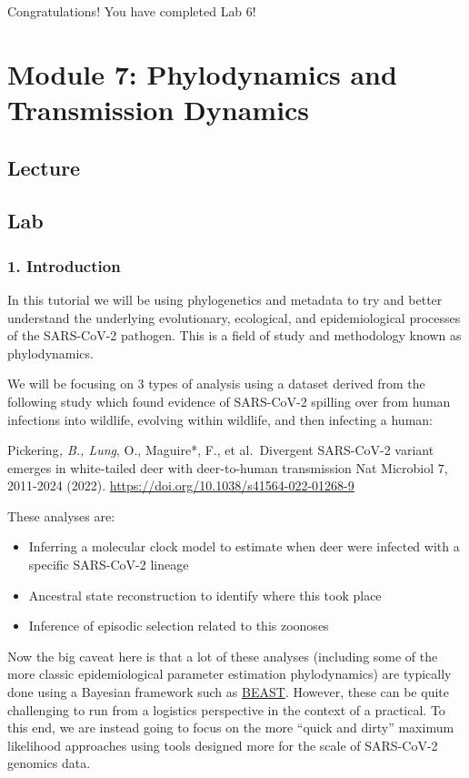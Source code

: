 \documentclass[
]{book}
\providecommand{\tightlist}{%
  \setlength{\itemsep}{0pt}\setlength{\parskip}{0pt}}
\begin{document}
Congratulations! You have completed Lab 6!

\chapter{Module 7: Phylodynamics and Transmission Dynamics}\label{module-7-phylodynamics-and-transmission-dynamics}

\section{Lecture}\label{lecture-6}

\section{Lab}\label{lab-4}

\subsection{1. Introduction}\label{introduction-2}

In this tutorial we will be using phylogenetics and metadata to try and better understand the underlying evolutionary, ecological, and epidemiological processes of the SARS-CoV-2 pathogen. This is a field of study and methodology known as phylodynamics.

We will be focusing on 3 types of analysis using a dataset derived from the following study which found evidence of SARS-CoV-2 spilling over from human infections into wildlife, evolving within wildlife, and then infecting a human:

Pickering\emph{, B., Lung}, O., Maguire*, F., et al.~Divergent SARS-CoV-2 variant emerges in white-tailed deer with deer-to-human transmission Nat Microbiol 7, 2011-2024 (2022). \url{https://doi.org/10.1038/s41564-022-01268-9}

These analyses are:

\begin{itemize}
\tightlist
\item
  Inferring a molecular clock model to estimate when deer were infected with a specific SARS-CoV-2 lineage
\item
  Ancestral state reconstruction to identify where this took place
\item
  Inference of episodic selection related to this zoonoses
\end{itemize}

Now the big caveat here is that a lot of these analyses (including some of the more classic epidemiological parameter estimation phylodynamics) are typically done using a Bayesian framework such as \href{http://www.beast2.org/}{BEAST}. However, these can be quite challenging to run from a logistics perspective in the context of a practical. To this end, we are instead going to focus on the more ``quick and dirty'' maximum likelihood approaches using tools designed more for the scale of SARS-CoV-2 genomics data.
\end{document}
